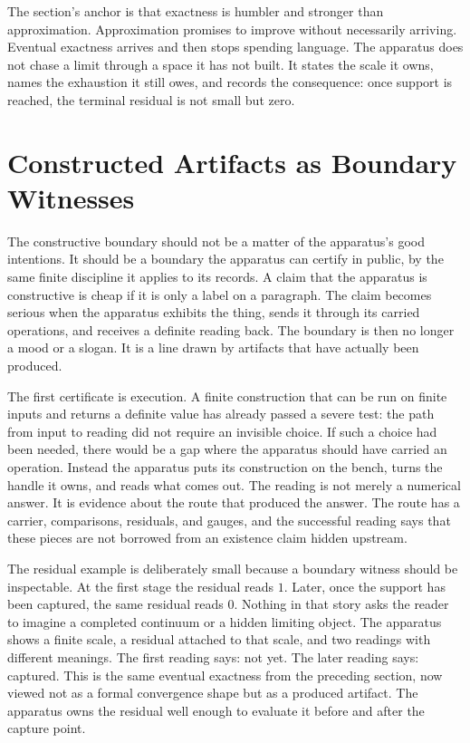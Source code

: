 The section's anchor is that exactness is humbler and stronger than approximation.
Approximation promises to improve without necessarily arriving. Eventual exactness
arrives and then stops spending language. The apparatus does not chase a limit
through a space it has not built. It states the scale it owns, names the exhaustion
it still owes, and records the consequence: once support is reached, the terminal
residual is not small but zero.

\section{Constructed Artifacts as Boundary Witnesses}

The constructive boundary should not be a matter of the apparatus's good
intentions. It should be a boundary the apparatus can certify in public, by the
same finite discipline it applies to its records. A claim that the apparatus is
constructive is cheap if it is only a label on a paragraph. The claim becomes
serious when the apparatus exhibits the thing, sends it through its carried
operations, and receives a definite reading back. The boundary is then no longer
a mood or a slogan. It is a line drawn by artifacts that have actually been
produced.

The first certificate is execution. A finite construction that can be run on
finite inputs and returns a definite value has already passed a severe test: the
path from input to reading did not require an invisible choice. If such a choice
had been needed, there would be a gap where the apparatus should have carried an
operation. Instead the apparatus puts its construction on the bench, turns the
handle it owns, and reads what comes out. The reading is not merely a numerical
answer. It is evidence about the route that produced the answer. The route has a
carrier, comparisons, residuals, and gauges, and the successful reading says that
these pieces are not borrowed from an existence claim hidden upstream.

The residual example is deliberately small because a boundary witness should be
inspectable. At the first stage the residual reads \(1\). Later, once the
support has been captured, the same residual reads \(0\). Nothing in that story
asks the reader to imagine a completed continuum or a hidden limiting object. The
apparatus shows a finite scale, a residual attached to that scale, and two
readings with different meanings. The first reading says: not yet. The later
reading says: captured. This is the same eventual exactness from the preceding
section, now viewed not as a formal convergence shape but as a produced artifact.
The apparatus owns the residual well enough to evaluate it before and after the
capture point.

